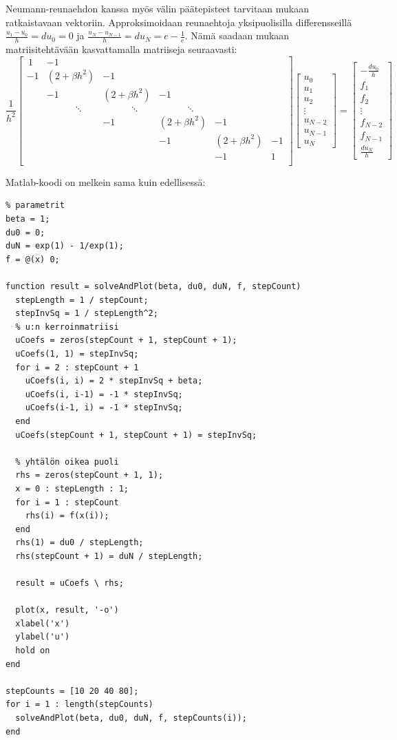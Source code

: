 \documentclass{article}
\begin{document}
Neumann-reunaehdon kanssa myös välin päätepisteet tarvitaan mukaan ratkaistavaan vektoriin.
Approksimoidaan reunaehtoja yksipuolisilla differensseillä $\frac{u_1 - u_0}{h} = du_0 = 0$
ja $\frac{u_N - u_{N-1}}{h} = du_N = e - \frac{1}{e}$. Nämä saadaan mukaan matriisitehtävään
kasvattamalla matriiseja seuraavasti:
\[
  \frac{1}{h^2}
  \begin{bmatrix}
    \,1 & -1 \\
    -1 & (2 + \beta h^2) & -1 \\
       & -1 & (2 + \beta h^2) & -1 \\
       & \qquad \quad \ddots &  \qquad \quad \ddots & \qquad \quad \ddots \\
    & & -1 & (2 + \beta h^2) & -1  \\
    & & & -1 & (2 + \beta h^2) & -1 \\
    & & & & -1 & 1 \, \\
  \end{bmatrix}
  \begin{bmatrix}
    u_0 \\ u_1 \\ u_2 \\ \vdots \\ u_{N-2} \\ u_{N-1} \\ u_N
  \end{bmatrix}
  =
  \begin{bmatrix}
    -\frac{du_0}{h} \\ f_1 \\ f_2 \\ \vdots \\ f_{N-2} \\ f_{N-1} \\ \frac{du_N}{h}
  \end{bmatrix}
\]

Matlab-koodi on melkein sama kuin edellisessä:

\begin{verbatim}
% parametrit
beta = 1;
du0 = 0;
duN = exp(1) - 1/exp(1);
f = @(x) 0;

function result = solveAndPlot(beta, du0, duN, f, stepCount)
  stepLength = 1 / stepCount;
  stepInvSq = 1 / stepLength^2;
  % u:n kerroinmatriisi
  uCoefs = zeros(stepCount + 1, stepCount + 1);
  uCoefs(1, 1) = stepInvSq;
  for i = 2 : stepCount + 1
    uCoefs(i, i) = 2 * stepInvSq + beta;
    uCoefs(i, i-1) = -1 * stepInvSq;
    uCoefs(i-1, i) = -1 * stepInvSq;
  end
  uCoefs(stepCount + 1, stepCount + 1) = stepInvSq;

  % yhtälön oikea puoli
  rhs = zeros(stepCount + 1, 1);
  x = 0 : stepLength : 1;
  for i = 1 : stepCount
    rhs(i) = f(x(i));
  end
  rhs(1) = du0 / stepLength;
  rhs(stepCount + 1) = duN / stepLength;

  result = uCoefs \ rhs;

  plot(x, result, '-o')
  xlabel('x')
  ylabel('u')
  hold on
end

stepCounts = [10 20 40 80];
for i = 1 : length(stepCounts)
  solveAndPlot(beta, du0, duN, f, stepCounts(i));
end
\end{verbatim}
\end{document}
